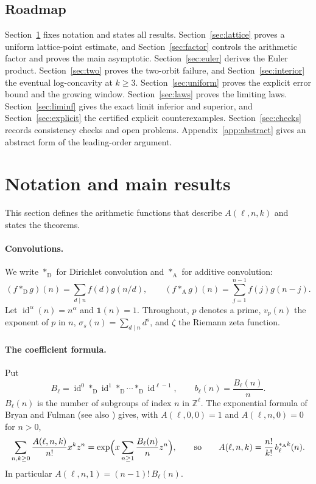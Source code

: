 \documentclass[11pt,a4paper]{article}
\theoremstyle{remark}
\numberwithin{equation}{section}
\newcommand{\id}{\operatorname{id}}
\newcommand{\Dc}{*_{\mathrm D}}
\newcommand{\Ac}{*_{\mathrm A}}
\newcommand{\one}{\mathbf 1}
\begin{document}
\subsection{Roadmap}
Section~\ref{sec:results} fixes notation and states all results. Section~\ref{sec:lattice} proves a uniform lattice-point estimate, and Section~\ref{sec:factor} controls the arithmetic factor and proves the main asymptotic. Section~\ref{sec:euler} derives the Euler product. Section~\ref{sec:two} proves the two-orbit failure, and Section~\ref{sec:interior} the eventual log-concavity at $k\ge3$. Section~\ref{sec:uniform} proves the explicit error bound and the growing window. Section~\ref{sec:laws} proves the limiting laws. Section~\ref{sec:liminf} gives the exact limit inferior and superior, and Section~\ref{sec:explicit} the certified explicit counterexamples. Section~\ref{sec:checks} records consistency checks and open problems. Appendix~\ref{app:abstract} gives an abstract form of the leading-order argument.

\section{Notation and main results}\label{sec:results}

This section defines the arithmetic functions that describe $A(\ell,n,k)$ and states the theorems.

\paragraph{Convolutions.} We write $\Dc$ for Dirichlet convolution and $\Ac$ for additive convolution:
\[
(f\Dc g)(n)=\sum_{d\mid n}f(d)g(n/d),\qquad (f\Ac g)(n)=\sum_{j=1}^{n-1}f(j)g(n-j).
\]
Let $\id^{\alpha}(n)=n^\alpha$ and $\one(n)=1$. Throughout, $p$ denotes a prime, $v_p(n)$ the exponent of $p$ in $n$, $\sigma_s(n)=\sum_{d\mid n}d^s$, and $\zeta$ the Riemann zeta function.

\paragraph{The coefficient formula.} Put
\begin{equation}\label{eq:B}
B_\ell=\id^{0}\Dc\id^{1}\Dc\cdots\Dc\id^{\ell-1},\qquad b_\ell(n)=\frac{B_\ell(n)}n .
\end{equation}
$B_\ell(n)$ is the number of subgroups of index $n$ in $\mathbb Z^\ell$. The exponential formula of Bryan and Fulman \cite{BryanFulman} (see also \cite{ABDV}) gives, with $A(\ell,0,0)=1$ and $A(\ell,n,0)=0$ for $n>0$,
\begin{equation}\label{eq:egf}
\sum_{n,k\ge0}\frac{A(\ell,n,k)}{n!}x^kz^n=\exp\Bigl(x\sum_{n\ge1}\frac{B_\ell(n)}n z^n\Bigr),
\qquad\text{so}\qquad
A(\ell,n,k)=\frac{n!}{k!}\,b_\ell^{\Ac k}(n).
\end{equation}
In particular $A(\ell,n,1)=(n-1)!\,B_\ell(n)$.
\end{document}
